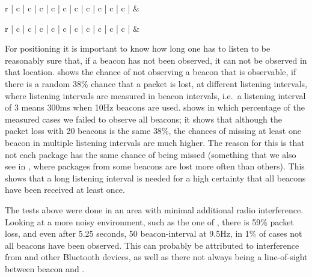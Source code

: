 \begin{table}
    \begin{tabular}{r | c | c | c | c | c | c | c | c | c | c |}
        &  \\
    \end{tabular}
    \caption{Expected chance that not all beacons have been observed at different listening intervals, with a random packet loss of 38\%.}
    \label{tbl:rss-packet-loss}
\end{table}

\begin{table}
    \begin{tabular}{r | c | c | c | c | c | c | c | c | c | c |}
        &  \\
    \end{tabular}
    \caption{Measured chance that not all beacons have been observed at different listening intervals.}
    \label{tbl:rss-packet-loss-empirical}
\end{table}

For positioning it is important to know how long one has to listen to be reasonably sure that, if a beacon has not been observed, it can not be observed in that location.
 shows the chance of not observing a beacon that is observable, if there is a random 38\% chance that a packet is lost, at different listening intervals, where listening intervals are measured in beacon intervals, i.e.\ a listening interval of 3 means 300ms when 10Hz beacons are used.
 shows in which percentage of the measured cases we failed to observe all beacons; it shows that although the packet loss with 20 beacons is the same 38\%, the chances of missing at least one beacon in multiple listening intervals are much higher.
The reason for this is that not each package has the same chance of being missed (something that we also see in , where packages from some beacons are lost more often than others).
This shows that a long listening interval is needed for a high certainty that all beacons have been received at least once.

The tests above were done in an area with minimal additional radio interference.
Looking at a more noisy environment, such as the one of , there is 59\% packet loss, and even after 5.25 seconds, 50 beacon-interval at 9.5Hz, in 1\% of cases not all beacons have been observed.
This can probably be attributed to interference from \wifi and other Bluetooth devices, as well as there not always being a line-of-sight between beacon and \device.
